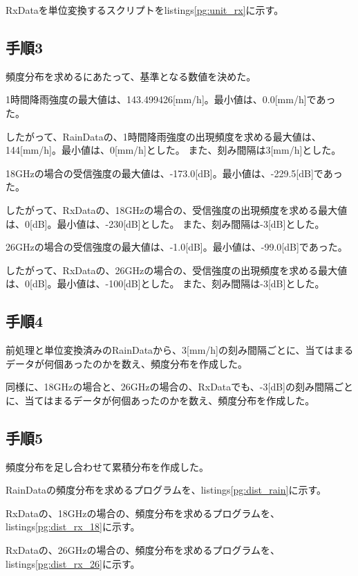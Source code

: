 \documentclass[a4paper, 11pt, titlepage]{jsarticle}
\begin{document}
RxDataを単位変換するスクリプトをlistings\ref{pg:unit_rx}に示す。



\subsection{手順3}
頻度分布を求めるにあたって、基準となる数値を決めた。

1時間降雨強度の最大値は、143.499426[mm/h]。最小値は、0.0[mm/h]であった。

したがって、RainDataの、1時間降雨強度の出現頻度を求める最大値は、144[mm/h]。最小値は、0[mm/h]とした。
また、刻み間隔は3[mm/h]とした。

18GHzの場合の受信強度の最大値は、-173.0[dB]。最小値は、-229.5[dB]であった。

したがって、RxDataの、18GHzの場合の、受信強度の出現頻度を求める最大値は、0[dB]。最小値は、-230[dB]とした。
また、刻み間隔は-3[dB]とした。

26GHzの場合の受信強度の最大値は、-1.0[dB]。最小値は、-99.0[dB]であった。

したがって、RxDataの、26GHzの場合の、受信強度の出現頻度を求める最大値は、0[dB]。最小値は、-100[dB]とした。
また、刻み間隔は-3[dB]とした。

\subsection{手順4}
前処理と単位変換済みのRainDataから、3[mm/h]の刻み間隔ごとに、当てはまるデータが何個あったのかを数え、頻度分布を作成した。

同様に、18GHzの場合と、26GHzの場合の、RxDataでも、-3[dB]の刻み間隔ごとに、当てはまるデータが何個あったのかを数え、頻度分布を作成した。

\subsection{手順5}
頻度分布を足し合わせて累積分布を作成した。

RainDataの頻度分布を求めるプログラムを、listings\ref{pg:dist_rain}に示す。

RxDataの、18GHzの場合の、頻度分布を求めるプログラムを、listings\ref{pg:dist_rx_18}に示す。

RxDataの、26GHzの場合の、頻度分布を求めるプログラムを、listings\ref{pg:dist_rx_26}に示す。
\end{document}
